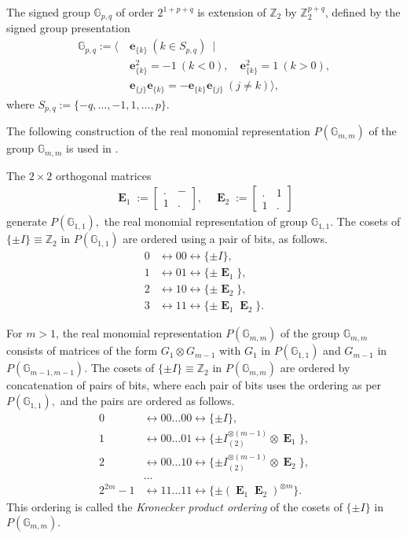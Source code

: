\documentclass[12pt,a4paper]{article}
\newcommand{\mb}[1]{\mathbb{#1}}
\newcommand{\mf}[1]{\mathbf{#1}}
\newcommand{\oE}{\mf{\operatorname{E}}}
\newcommand{\G}{\mb{G}}
\newcommand{\Z}{\mb{Z}}
\newcommand{\Rep}{P}
\begin{document}
The signed group
$\G_{p,q}$ of order $2^{1+p+q}$ 
is extension of $\Z_2$ by $\Z_2^{p+q}$,
defined by the signed group presentation
%
\begin{align*}
\G_{p,q} := \bigg\langle \ 
&\mf{e}_{\{k\}}\ (k \in S_{p,q})\ \mid
\\
&\mf{e}_{\{k\}}^2 = -1\ (k < 0), \quad \mf{e}_{\{k\}}^2 = 1\ (k > 0),
\\
&\mf{e}_{\{j\}}\mf{e}_{\{k\}} = -\mf{e}_{\{k\}}\mf{e}_{\{j\}}\ (j \neq k) \bigg\rangle,
\end{align*}
%
where $S_{p,q} := \{-q,\ldots,-1,1,\ldots,p\}.$

The following construction of the real monomial representation $\Rep(\G_{m,m})$
of the group $\G_{m,m}$ is used in \cite{Leo14Constructions}.

The $2 \times 2$ orthogonal matrices
\begin{align*}
\oE_1 :=
\left[
\begin{array}{cc}
. & - \\
1 & .
\end{array}
\right],
\quad
\oE_2 :=
\left[
\begin{array}{cc}
. & 1 \\
1 & .
\end{array}
\right]
\end{align*}
generate $\Rep(\G_{1,1}),$ the real monomial representation of group $\G_{1,1}.$
The cosets of $\{\pm I\} \equiv \Z_2$ in $\Rep(\G_{1,1})$ are
ordered using a pair of bits, as follows.
\begin{align*}
0 &\leftrightarrow 00 \leftrightarrow \{ \pm I \},
\\
1 &\leftrightarrow 01 \leftrightarrow \{ \pm \oE_1 \},
\\
2 &\leftrightarrow 10 \leftrightarrow \{ \pm \oE_2 \},
\\
3 &\leftrightarrow 11 \leftrightarrow \{ \pm \oE_1 \oE_2 \}.
\end{align*}

For $m > 1$,
the real monomial representation $\Rep(\G_{m,m})$ of the 
group $\G_{m,m}$ consists of matrices of the form $G_1 \otimes G_{m-1}$
with $G_1$ in $\Rep(\G_{1,1})$ and $G_{m-1}$ in $\Rep(\G_{m-1,m-1}).$
The cosets of $\{\pm I\} \equiv \Z_2$ in $\Rep(\G_{m,m})$ are
ordered by concatenation of pairs of bits, 
where each pair of bits uses the ordering as per $\Rep(\G_{1,1}),$
and the pairs are ordered as follows.
\begin{align*}
0 &\leftrightarrow 00 \ldots 00 \leftrightarrow \{ \pm I \},
\\
1 &\leftrightarrow 00 \ldots 01 \leftrightarrow \{ \pm I_{(2)}^{\otimes {(m-1)}} \otimes  \oE_1 \},
\\
2 &\leftrightarrow 00 \ldots 10 \leftrightarrow \{ \pm I_{(2)}^{\otimes {(m-1)}} \otimes  \oE_2 \},
\\
&\ldots
\\
2^{2m} - 1 &\leftrightarrow 11 \ldots 11 \leftrightarrow \{ \pm (\oE_1 \oE_2)^{\otimes {m}} \}.
\end{align*}
This ordering is called 
the \emph{Kronecker product ordering} of the cosets of $\{\pm I\}$ in $\Rep(\G_{m,m}).$
\end{document}
